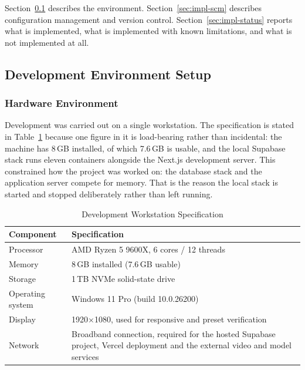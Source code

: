 \documentclass[12pt, oneside]{article} %
\newcommand{\tabbreak}{\hyphenpenalty=200\exhyphenpenalty=200\tolerance=4000\hbadness=10000\hspace{0pt}}
\begin{document}
Section~\ref{sec:impl-env} describes the environment. Section~\ref{sec:impl-scm} describes configuration management and version control. Section~\ref{sec:impl-status} reports what is implemented, what is implemented with known limitations, and what is not implemented at all.

\subsection{Development Environment Setup}
\label{sec:impl-env}

\subsubsection{Hardware Environment}

Development was carried out on a single workstation. The specification is stated in Table~\ref{tab:dev_hardware} because one figure in it is load-bearing rather than incidental: the machine has 8\,GB installed, of which 7.6\,GB is usable, and the local Supabase stack runs eleven containers alongside the Next.js development server. This constrained how the project was worked on: the database stack and the application server compete for memory. That is the reason the local stack is started and stopped deliberately rather than left running.

\begin{table}[H]
\caption{Development Workstation Specification}
\label{tab:dev_hardware}
\vspace{-4mm}
\begin{center}
\renewcommand{\arraystretch}{1.25}
\footnotesize
\begin{tabular}{|>{\raggedright\arraybackslash\tabbreak}p{4.0cm}|>{\raggedright\arraybackslash\tabbreak}p{9.81cm}|}
\hline
\textbf{Component} & \textbf{Specification} \\
\hline \hline
Processor & AMD Ryzen 5 9600X, 6 cores / 12 threads \\ \hline
Memory & 8\,GB installed (7.6\,GB usable) \\ \hline
Storage & 1\,TB NVMe solid-state drive \\ \hline
Operating system & Windows 11 Pro (build 10.0.26200) \\ \hline
Display & 1920$\times$1080, used for responsive and preset verification \\ \hline
Network & Broadband connection, required for the hosted Supabase project, Vercel deployment and the external video and model services \\ \hline
\end{tabular}
\end{center}
\end{table}
\end{document}
